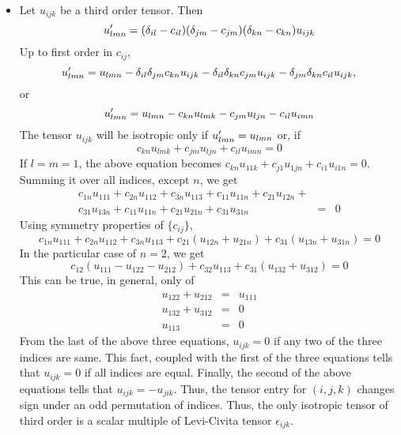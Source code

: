 \begin{itemize}
\item Let $u_{ijk}$ be a third order tensor. Then
\[
u_{lmn}^\prime = (\delta_{il} - c_{il})(\delta_{jm} - c_{jm})(\delta_{kn} - c_{kn})u_{ijk}
\]
Up to first order in $c_{ij}$,
\[
u_{lmn}^\prime = u_{lmn} - \delta_{il}\delta_{jm}c_{kn}u_{ijk} - \delta_{il}\delta_{kn}c_{jm}u_{ijk} - \delta_{jm}\delta_{kn}c_{il}u_{ijk},
\]
or
\[
u_{lmn}^\prime = u_{lmn} - c_{kn}u_{lmk} - c_{jm}u_{ljn} - c_{il}u_{imn}
\]
The tensor $u_{ijk}$ will be isotropic only if $u_{lmn}^\prime = u_{lmn}$ or, if
\[
c_{kn}u_{lmk} + c_{jm}u_{ljn} + c_{il}u_{imn} = 0
\]
If $l = m = 1$, the above equation becomes $c_{kn}u_{11k} + c_{j1}u_{1jn} + c_{i1}u_{i1n} = 0$. Summing it over all indices, except $n$, we get
\begin{eqnarray*}
c_{1n}u_{111} + c_{2n}u_{112} + c_{3n}u_{113} + c_{11}u_{11n} + c_{21}u_{12n}  + & & \\
c_{31}u_{13n} + c_{11}u_{11n} + c_{21}u_{21n} + c_{31}u_{31n} &=& 0
\end{eqnarray*}
Using symmetry properties of $\{c_{ij}\}$,
\[
c_{1n}u_{111} + c_{2n}u_{112} + c_{3n}u_{113} + c_{21}(u_{12n} + u_{21n}) + c_{31}(u_{13n} + u_{31n})= 0
\]
In the particular case of $n = 2$, we get
\[
c_{12}(u_{111} - u_{122} - u_{212}) + c_{32}u_{113} + c_{31}(u_{132} + u_{312}) = 0
\]
This can be true, in general, only of
\begin{eqnarray*}
u_{122} + u_{212} &=& u_{111} \\
u_{132} + u_{312} &=& 0 \\
u_{113} &=& 0
\end{eqnarray*}
From the last of the above three equations, $u_{ijk} = 0$ if any two of the three indices are same. This fact, coupled with the first of the three equations tells that $u_{ijk} = 0$
if all indices are equal. Finally, the second of the above equations tells that $u_{ijk} = -u_{jik}$. Thus, the tensor entry for $(i, j, k)$ changes sign under an odd permutation of
indices. Thus, the only isotropic tensor of third order is a scalar multiple of Levi-Civita tensor $\epsilon_{ijk}$.


\end{itemize}
